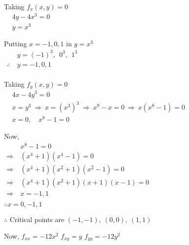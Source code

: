 \documentclass[12pt]{article}
\begin{document}
\vspace{3ex}
\begin{minipage}[t]{0.39\linewidth}
\noindent
Taking $f_x(x, y)=0$\\
$\begin{aligned}
   & 4y-4x^3 = 0\\
   & y = x^3
\end{aligned}$

\vspace{8ex}
Putting $x = -1, 0, 1$ in $y=x^3$\\
$\begin{aligned}
   & y=(-1)^3, \ \ 0^3, \ \ 1^3 \\
   \therefore \ & y=-1,0,1 \\
\end{aligned}$

\vspace{4ex}
\end{minipage}\hspace{0.5ex}{\vrule width 1pt}\hspace{0.5ex}
\begin{minipage}[t]{0.59\linewidth}
\noindent
Taking $f_y(x, y)=0$\\
$\begin{aligned}
   & 4x-4y^3 = 0\\
   & x = y^3 \ \Rightarrow \ x = (x^3)^3 \ \Rightarrow \ x^9-x = 0 \ \Rightarrow \ x(x^8-1) = 0\\
   & x=0, \quad x^8-1=0
\end{aligned}$

\vspace{4ex}
Now,\\
$\begin{aligned}
& x^8-1=0\\
\Rightarrow \ & \left(x^4+1\right)\left(x^4-1\right)=0 \\
\Rightarrow \ & \left(x^4+1\right)\left(x^2+1\right)\left(x^2-1\right)=0 \\
\Rightarrow \ & \left(x^4+1\right)\left(x^2+1\right)(x+1)(x-1)=0 \\
\Rightarrow \ & x =-1,1 \\
\end{aligned}$\\[1.5ex]
$\therefore x = 0,-1,1$
\end{minipage}

\vspace{2ex}
$\therefore$ Critical points are $(-1,-1), \ (0,0), \ (1,1)$

Now, \quad $f_{x x}=-12 x^2$ \tabs $f_{x y}=y$ \tabs $f_{y y}=-12 y^2$
\end{document}
